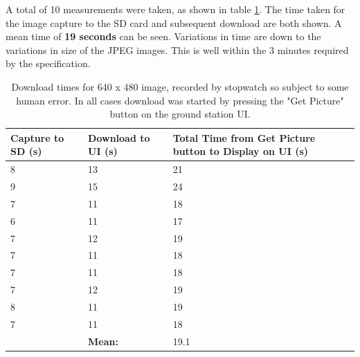 A total of 10 measurements were taken, as shown in table \ref{table:download_time_test}.
The time taken for the image capture to the SD card and subsequent download are both
shown. A mean time of \textbf{19 seconds} can be seen. Variations in time are down to the
variations in size of the JPEG images. This is well within the 3 minutes required by the specification.

\begin{table}[!hbtp]

	\centering
	\begin{tabular}{ | p{3cm} | p{3cm} | p{4cm} | }
	\hline
	\textbf{Capture to SD (s)} & \textbf{Download to UI (s)} & 
	\textbf{Total Time from Get Picture button to Display on UI (s)} \\ \hline

	8 & 13  & 21 \\ \hline
	9 & 15  & 24 \\ \hline
	7 & 11  & 18 \\ \hline
	6 & 11  & 17 \\ \hline
	7 & 12  & 19 \\ \hline
	7 & 11  & 18 \\ \hline
	7 & 11  & 18 \\ \hline
	7 & 12  & 19 \\ \hline
	8 & 11  & 19 \\ \hline
	7 & 11  & 18 \\ \hline
	 & \textbf{Mean:} & 19.1 \\ \hline

	\end{tabular}
	\caption{Download times for 640 x 480 image, recorded by stopwatch so subject to some human error. In all cases download was started by pressing the "Get Picture" button on the ground station UI.}
	\label{table:download_time_test}
\end{table}




